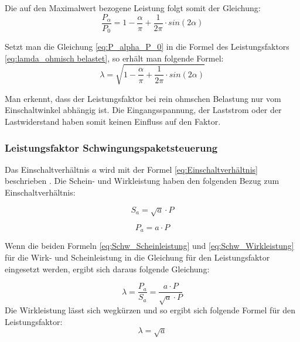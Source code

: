 Die auf den Maximalwert bezogene Leistung folgt somit der Gleichung:
\begin{equation}\label{eq:P_alpha_P_0}
\frac{P_{\alpha}}{P_0} = 1-\frac{\alpha}{\pi}+\frac{1}{2\pi} \cdot sin(2\alpha) 
\end{equation}

Setzt man die Gleichung \ref{eq:P_alpha_P_0} in die Formel des Leistungsfaktors \ref{eq:lamda_ohmisch belastet}, so erhält man folgende Formel:
\begin{equation}\label{eq:lamda_p_n}
\lambda = \sqrt{1-\frac{\alpha}{\pi}+\frac{1}{2\pi} \cdot sin(2\alpha)}
\end{equation}

Man erkennt, dass der Leistungsfaktor bei rein ohmschen Belastung nur vom Einschaltwinkel abhängig ist. Die Eingangsspannung, der Laststrom oder der Lastwiderstand haben somit keinen Einfluss auf den Faktor.



\newpage
\subsubsection{Leistungsfaktor Schwingungspaketsteuerung}\label{sec:Leistungsfaktor_Schwingugnspaketsteuerung}

Das Einschaltverhältnis $a$ wird mit der Formel \ref{eq:Einschaltverhältnis} beschrieben \cite{Leistungselektronik}. Die Schein- und Wirkleistung haben den folgenden Bezug zum Einschaltverhältnis:

\begin{equation}\label{eq:Schw_Scheinleistung}
S_a = \sqrt{a} \cdot P 
\end{equation}

\begin{equation}\label{eq:Schw_Wirkleistung}
P_a = a \cdot P 
\end{equation}

Wenn die beiden Formeln \ref{eq:Schw_Scheinleistung} und \ref{eq:Schw_Wirkleistung} für die Wirk- und Scheinleistung in die Gleichung für den Leistungsfaktor eingesetzt werden, ergibt sich daraus folgende Gleichung: 

\begin{equation}
\lambda = \frac{P_a }{S_a} = \frac{a \cdot P}{\sqrt{a} \cdot P}
\end{equation}
Die Wirkleistung lässt sich wegkürzen und so ergibt sich folgende Formel für den Leistungsfaktor:
\begin{equation}\label{eq:lamda_s_n}
\lambda = \sqrt{a}
\end{equation}

